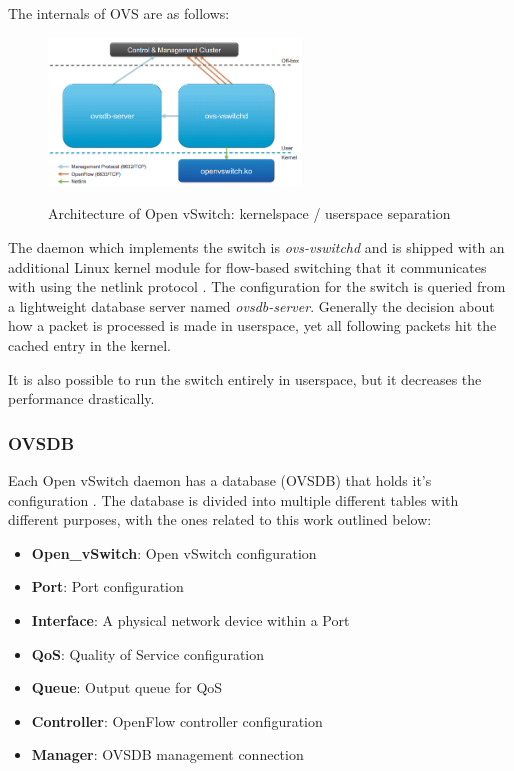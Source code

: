 The internals of OVS are as follows:

\begin{figure}[H]
\centering
\includegraphics[width=0.6\textwidth]{images/fundamentals/openvswitch_architecture.png}
\caption{Architecture of Open vSwitch: kernelspace / userspace separation}  \cite{prognetworkingovs}
\end{figure}

The daemon which implements the switch is \textit{ovs-vswitchd} and is shipped with an additional Linux kernel module for flow-based switching that it communicates with using the netlink protocol \cite{ovsdeepdive}. The configuration for the switch is queried from a lightweight database server named \textit{ovsdb-server}.
Generally the decision about how a packet is processed is made in userspace, yet all following packets hit the cached entry in the kernel.

It is also possible to run the switch entirely in userspace, but it decreases the performance drastically.


\subsubsection{OVSDB}

Each Open vSwitch daemon has a database (OVSDB) that holds it's configuration \cite{ovsdbmanual}. The database is divided into multiple different tables with different purposes, with the ones related to this work outlined below:
\begin{itemize}
\item \textbf{Open\_vSwitch}: Open vSwitch configuration
\item \textbf{Port}: Port configuration
\item \textbf{Interface}: A physical network device within a Port
\item \textbf{QoS}: Quality of Service configuration
\item \textbf{Queue}: Output queue for QoS
\item \textbf{Controller}: OpenFlow controller configuration
\item \textbf{Manager}: OVSDB management connection
\end{itemize}


